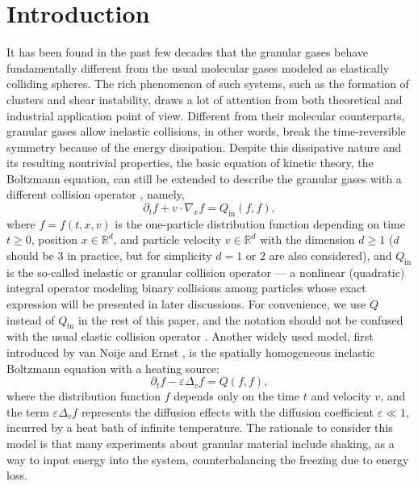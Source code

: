 \documentclass[review,times]{elsarticle}
\begin{document}
\linenumbers

\section{Introduction}

It has been found in the past few decades that the granular gases behave fundamentally different from the usual molecular gases modeled as elastically colliding spheres. The rich phenomenon of such systems, such as the formation of clusters and shear instability, draws a lot of attention from both theoretical and industrial application point of view. Different from their molecular counterparts, granular gases allow inelastic collisions, in other words, break the time-reversible symmetry because of the energy dissipation. Despite this dissipative nature and its resulting nontrivial properties, the basic equation of kinetic theory, the Boltzmann equation, can still be extended to describe the granular gases with a different collision operator \cite{BP04}, namely,
\begin{equation}
\partial_t f + v \cdot \nabla_x f = Q_{\text{in}}(f,f),
\label{boltz}
\end{equation}
where $f=f(t,x,v)$ is the one-particle distribution function depending on time $t \geq 0$, position $x \in \mathbb{R}^d$, and particle velocity $v \in \mathbb{R}^d$ with the dimension $d \geq 1$ ($d$ should be 3 in practice, but for simplicity $d=1$ or $2$ are also considered), and $Q_{\text{in}}$ is the so-called inelastic or granular collision operator --- a nonlinear (quadratic) integral operator modeling binary collisions among particles whose exact expression will be presented in later discussions. For convenience, we use $Q$ instead of $Q_{\text{in}}$ in the rest of this paper, and the notation should not be confused with the usual elastic collision operator \cite{Cercignani}. Another widely used model, first introduced by van Noije and Ernst \cite{noije}, is the spatially homogeneous inelastic Boltzmann equation with a heating source:
\begin{equation} \label{inBoltz}
\partial_tf-\varepsilon \Delta_vf=Q(f,f),
\end{equation}
where the distribution function $f$ depends only on the time $t$ and velocity $v$, and the term $\varepsilon \Delta_vf$ represents the diffusion effects with the diffusion coefficient $\varepsilon \ll 1$, incurred by a heat bath of infinite temperature. The rationale to consider this model is that many experiments about granular material include shaking, as a way to input energy into the system, counterbalancing the freezing due to energy loss.
\end{document}
